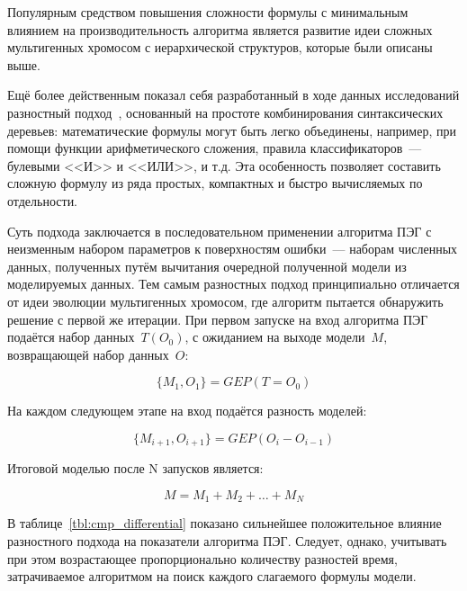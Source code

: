 Популярным средством повышения сложности формулы с минимальным влиянием на производительность алгоритма является развитие идеи сложных мультигенных хромосом с иерархической структуров, которые были описаны выше.

Ещё более действенным показал себя разработанный в ходе данных исследований разностный подход~\cite{SergMir_03_2014_info_problem, SergMir_04_2014_smolensk}, основанный на простоте комбинирования синтаксических деревьев: математические формулы могут быть легко объединены, например, при помощи функции арифметического сложения, правила классификаторов~--- булевыми <<И>> и <<ИЛИ>>, и т.д. Эта особенность позволяет составить сложную формулу из ряда простых, компактных и быстро вычисляемых по отдельности.

Суть подхода заключается в последовательном применении алгоритма ПЭГ с неизменным набором параметров к поверхностям ошибки~--- наборам численных данных, полученных путём вычитания очередной полученной модели из моделируемых данных. Тем самым разностных подход принципиально отличается от идеи эволюции мультигенных хромосом, где алгоритм пытается обнаружить решение с первой же итерации. При первом запуске на вход алгоритма ПЭГ подаётся набор данных~$T(O_{0})$, с ожиданием на выходе модели~$M$, возвращающей набор данных~$O$:

\begin{equation}
\label{eq:zerg_diff_m_1}
\{M_{1}, O_{1}\} = GEP(T = O_{0})
\end{equation}

На каждом следующем этапе на вход подаётся разность моделей:

\begin{equation}
\label{eq:zerg_diff_m_i}
\{M_{i+1}, O_{i+1}\} = GEP(O_{i} - O_{i - 1})
\end{equation}

Итоговой моделью после N запусков является:

\begin{equation}
\label{eq:zerg_diff_model}
M = M_{1} + M_{2} + \ldots + M_{N}
\end{equation}

В таблице~\ref{tbl:cmp_differential} показано сильнейшее положительное влияние разностного подхода на показатели алгоритма ПЭГ. Следует, однако, учитывать при этом возрастающее пропорционально количеству разностей время, затрачиваемое алгоритмом на поиск каждого слагаемого формулы модели.





